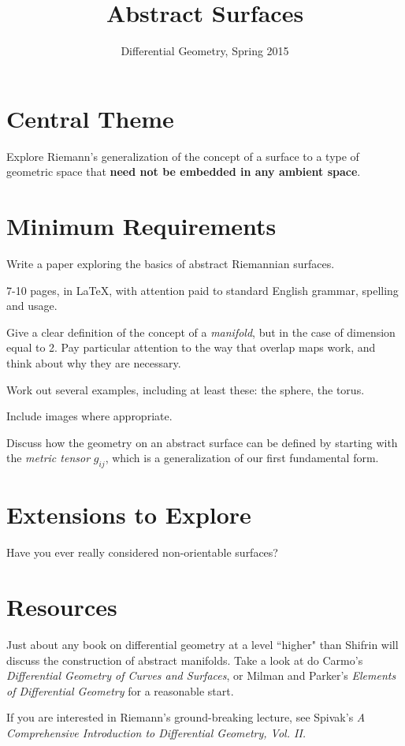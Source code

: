 \documentclass[12pt]{amsart}
\begin{document}
\title{Abstract Surfaces}
\author{Differential Geometry, Spring 2015}

\maketitle

\section*{Central Theme}

Explore Riemann's generalization of the concept of a surface to a type of geometric space that \textbf{need not be embedded in any ambient space}.

\section*{Minimum Requirements}

Write a paper exploring the basics of abstract Riemannian surfaces. 
\begin{compactitem}
\item 7-10 pages, in \LaTeX, with attention paid to standard English grammar, spelling and usage.
\item Give a clear definition of the concept of a \emph{manifold}, but in the case of dimension equal to 2. Pay particular attention to the way that overlap maps work, and think about why they are necessary.
\item Work out several examples, including at least these: the sphere, the torus.
\item Include images where appropriate.
\item Discuss how the geometry on an abstract surface can be defined by starting with the \emph{metric tensor} $g_{ij}$, which is a generalization of our first fundamental form.
\end{compactitem}

\section*{Extensions to Explore}

Have you ever really considered non-orientable surfaces?

\section*{Resources}

Just about any book on differential geometry at a level ``higher" than Shifrin will discuss the construction of abstract manifolds. Take a look at do Carmo's \emph{Differential Geometry of Curves and Surfaces}, or Milman and Parker's \emph{Elements of Differential Geometry} for a reasonable start.

If you are interested in Riemann's ground-breaking lecture, see Spivak's \emph{A Comprehensive Introduction to Differential Geometry, Vol. II.} 
\end{document}
